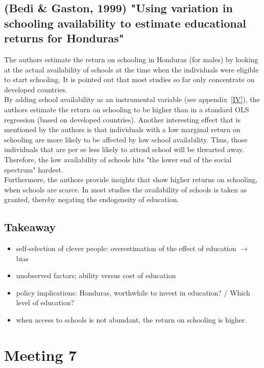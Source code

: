 \documentclass[12pt,a4paper]{article}
\begin{document}
  \subsection{(Bedi \& Gaston, 1999) "Using variation in schooling availability to estimate educational returns for Honduras"} %
  \label{sub:bedi}
  The authors estimate the return on schooling in Honduras (for males) by looking at the actual availability of schools at the
  time when the individuals were eligible to start schooling. It is pointed out that most studies so far only concentrate
  on developed countries.\\
  By adding school availability as an instrumental variable (see appendix~\ref{IV}), the authors estimate the return
  on schooling to be higher than in a standard OLS regression (based on developed countries). Another interesting effect
  that is mentioned by the authors is that individuals with a low marginal return on schooling are more likely to
  be affected by low school availability. Thus, those individuals that are per se less likely to attend school will
  be thwarted away. Therefore, the low availability of schools hits "the lower end of the social spectrum" hardest.\\
  Furthermore, the authors provide insights that show higher returns on schooling, when schools are scarce. In most
  studies the availability of schools is taken as granted, thereby negating the endogeneity of education.\\
  
  \subsection{Takeaway} %
    \begin{itemize}
      \item self-selection of clever people: overestimation of the effect of education $\rightarrow$
        bias
      \item unobserved factors; ability versus cost of education
      \item policy implications: Honduras, worthwhile to invest in education? / Which level of
        education?
      \item when access to schools is not abundant, the return on schooling is higher.
    \end{itemize}
  
  \section{Meeting 7} %
  \label{sec:Meeting 7}
\end{document}
